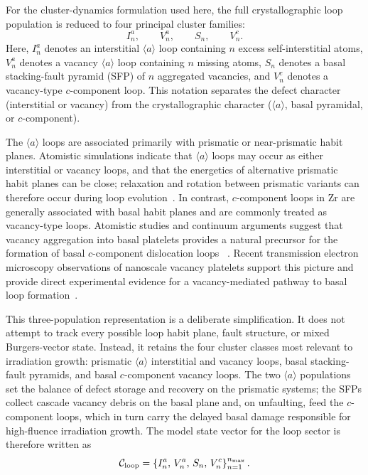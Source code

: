 For the cluster-dynamics formulation used here, the full crystallographic
loop population is reduced to four principal cluster families:
\begin{equation}
  I_n^a, \qquad V_n^a, \qquad S_n, \qquad V_n^c .
  \label{eq:zr_loop_classes}
\end{equation}
Here, $I_n^a$ denotes an interstitial $\langle a\rangle$ loop containing
$n$ excess self-interstitial atoms, $V_n^a$ denotes a vacancy
$\langle a\rangle$ loop containing $n$ missing atoms, $S_n$ denotes a basal
stacking-fault pyramid (SFP) of $n$ aggregated vacancies, and $V_n^c$ denotes
a vacancy-type $c$-component loop.  This notation separates the defect
character (interstitial or vacancy) from the crystallographic character
($\langle a\rangle$, basal pyramidal, or $c$-component).

The $\langle a\rangle$ loops are associated primarily with prismatic or
near-prismatic habit planes.  Atomistic simulations indicate that
$\langle a\rangle$ loops may occur as either interstitial or vacancy loops,
and that the energetics of alternative prismatic habit planes can be close;
relaxation and rotation between prismatic variants can therefore occur during
loop evolution~\citep{HulseRace2021}.  In contrast, $c$-component loops in
Zr are generally associated with basal habit planes and are commonly treated
as vacancy-type loops.  Atomistic studies and continuum arguments suggest
that vacancy aggregation into basal platelets provides a natural precursor
for the formation of basal $c$-component dislocation loops
~\citep{WooLiu2009,LiuBeyerleinHan2020}.  Recent transmission electron
microscopy observations of nanoscale vacancy platelets support this picture
and provide direct experimental evidence for a vacancy-mediated pathway to
basal loop formation~\citep{LiuBeyerleinHan2020}.

This three-population representation is a deliberate simplification.  It does
not attempt to track every possible loop habit plane, fault structure, or
mixed Burgers-vector state.  Instead, it retains the four cluster classes most relevant
to irradiation growth: prismatic $\langle a\rangle$ interstitial and vacancy
loops, basal stacking-fault pyramids, and basal $c$-component vacancy loops.
The two $\langle a\rangle$ populations set the balance of defect storage and
recovery on the prismatic systems; the SFPs collect cascade vacancy debris on
the basal plane and, on unfaulting, feed the $c$-component loops, which in turn
carry the delayed basal damage responsible for high-fluence irradiation growth.  The model state vector for the loop sector
is therefore written as
\begin{equation}
  \mathcal{C}_{\rm loop}
  =
  \left\{
  I_n^a,\,
  V_n^a,\,
  S_n,\,
  V_n^c
  \right\}_{n=1}^{n_{\max}} .
  \label{eq:zr_loop_state_vector}
\end{equation}

